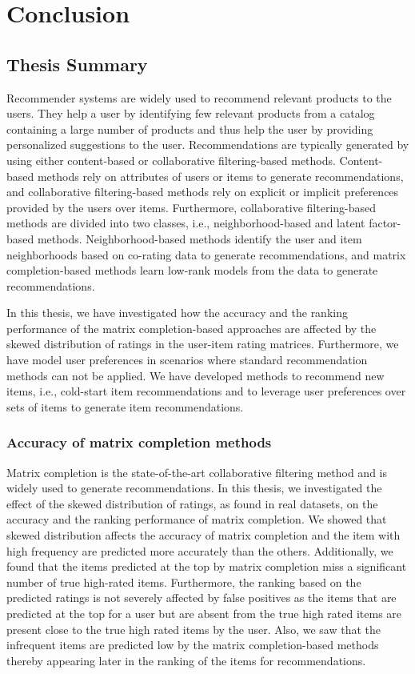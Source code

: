 \chapter{Conclusion}
\label{ch:conclusion}


\section{Thesis Summary}
Recommender systems are widely used to recommend relevant products to the users. They help a user by identifying few
relevant products from a catalog containing a large number of products and thus help the user by providing
personalized suggestions to the user. Recommendations are typically generated by using either content-based
or collaborative filtering-based methods. Content-based methods rely on attributes of users or items to generate
recommendations, and collaborative filtering-based methods rely on explicit or implicit preferences provided by the
users over items. Furthermore, collaborative filtering-based methods are divided into two classes,
i.e.,  neighborhood-based and latent factor-based methods. 
Neighborhood-based methods identify the user and item neighborhoods based on co-rating data to generate recommendations,
and matrix completion-based methods learn low-rank models from the data to generate recommendations.


In this thesis, we have investigated how the accuracy and the ranking performance of the matrix completion-based approaches are affected by the skewed distribution of ratings in the user-item rating matrices. 
Furthermore, we have model user preferences in scenarios where standard recommendation methods can not be applied.  We have developed methods to recommend new items, i.e., cold-start item recommendations and to leverage user preferences over sets of items to generate item recommendations.



\subsection*{Accuracy of matrix completion methods}
Matrix completion is the state-of-the-art collaborative filtering method
and is widely used to generate recommendations.
In this thesis, we investigated the effect of the skewed distribution of
ratings,  as found in real datasets, on the accuracy and the ranking
performance of matrix completion. We showed that skewed distribution affects
the accuracy of matrix completion and the item with high frequency are
predicted more accurately than the others. Additionally, we found that the
items predicted at the top by matrix completion miss a significant number of
true high-rated items. 
Furthermore, the ranking based on the predicted ratings is not severely
affected by false positives as the items that are predicted at the top for a
user but are absent from the true high rated items are present close to the
true high rated items by the user. Also, we saw that the infrequent items are predicted low by the matrix completion-based methods thereby appearing later in the ranking of the items for recommendations.



